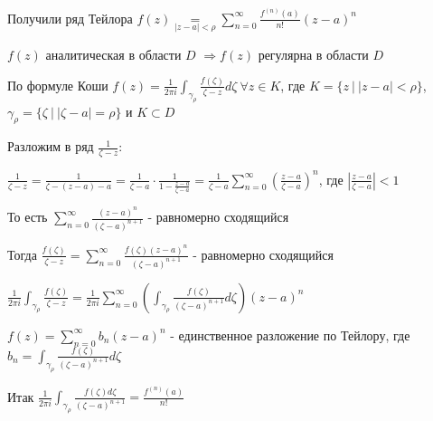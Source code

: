 Получили ряд Тейлора $f(z) \underset{|z - a| < \rho}{=} \sum_{n = 0}^\infty \frac{f^{(n)} (a)}{n!} (z - a)^n$

\begin{MyTheorem}
    \Ths $f(z)$ аналитическая в области $D$ $\Longrightarrow f(z)$ регулярна в области $D$
\end{MyTheorem}

\begin{MyProof}
    По формуле Коши $f(z) = \frac{1}{2\pi i} \int_{\gamma_\rho} \frac{f(\zeta)}{\zeta - z} d\zeta \ \forall z \in K$, где $K = \{z \ | \ |z - a| < \rho\}$, $\gamma_\rho = \{ \zeta \ | \ |\zeta - a| = \rho\}$ и $K \subset D$

    Разложим в ряд $\frac{1}{\zeta - z}$:

    $\frac{1}{\zeta - z} = \frac{1}{\zeta - (z - a) - a} = \frac{1}{\zeta - a} \cdot \frac{1}{1 - \frac{z - a}{\zeta - a}} = \frac{1}{\zeta - a} \sum_{n = 0}^\infty \left(\frac{z - a}{\zeta - a}\right)^n$, где $\left|\frac{z - a}{\zeta - a}\right| < 1$

    То есть $\sum_{n = 0}^\infty \frac{(z - a)^n}{(\zeta - a)^{n + 1}}$ - равномерно сходящийся

    Тогда $\frac{f(\zeta)}{\zeta - z} = \sum_{n = 0}^\infty \frac{f(\zeta) (z - a)^n}{(\zeta - a)^{n + 1}}$ - равномерно сходящийся 

    $\frac{1}{2\pi i} \int_{\gamma_\rho} \frac{f(\zeta)}{\zeta - z} = \frac{1}{2\pi i} \sum_{n = 0}^\infty \left(\int_{\gamma_\rho} \frac{f(\zeta)}{(\zeta - a)^{n + 1}} d\zeta \right) (z - a)^n$

    $f(z) = \sum_{n = 0}^\infty b_n (z - a)^n$ - единственное разложение по Тейлору, где $b_n = \int_{\gamma_\rho} \frac{f(\zeta)}{(\zeta - a)^{n + 1}} d\zeta$

    Итак $\frac{1}{2\pi i} \int_{\gamma_\rho} \frac{f(\zeta) d\zeta}{(\zeta - a)^{n + 1}} = \frac{f^{(n)}(a)}{n!}$
\end{MyProof}
